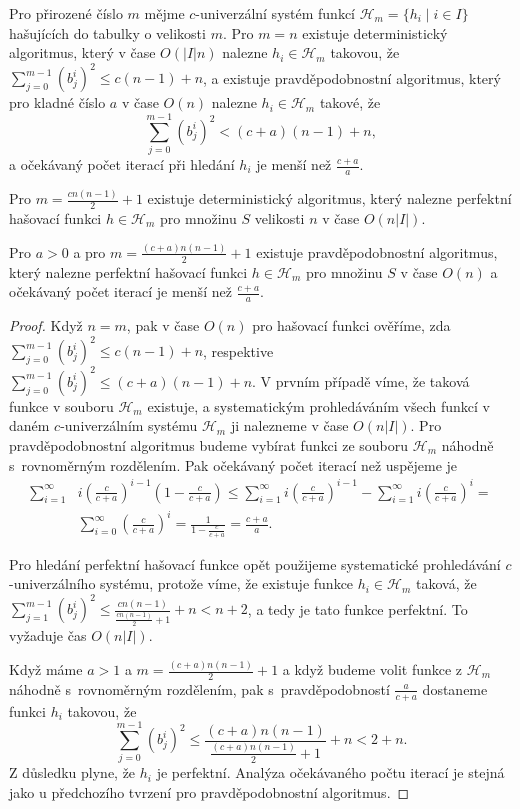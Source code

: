\documentclass[a4paper,12pt]{article}
\begin{document}
\begin{tvrzeni}Pro přirozené číslo $m$ mějme $
c$-univerzální systém funkcí $\mathcal H_m=\{h_i\mid i\in 
I\}$ hašujících do tabulky o velikosti 
$m$. Pro $m=n$ existuje deterministický algoritmus, 
který v čase $O(|I|n)$ nalezne $h_i\in \mathcal H_m$ takovou, že $
\sum_{j=0}^{m-1}(b^i_j)^2\le c(n-1)+n$, 
a existuje pravděpodobnostní algoritmus, který pro kladné číslo 
$a$ v čase $O(n)$ nalezne $h_i\in \mathcal H_m$ takové, že 
$$\sum_{j=0}^{m-1}(b^i_j)^2<(c+a)(n-1)+n,$$
a očekávaný počet iterací při hledání $h_i$ je menší než $\frac {
c+a}a$.   

Pro $m=\frac {cn(n-1)}2+1$ existuje deterministický algoritmus, 
který nalezne perfektní hašovací funkci  $h\in \mathcal H_
m$ pro množinu $S$ 
velikosti $n$ v čase $O(n|I|)$.

Pro $a>0$ a pro $m=\frac {(c+a)n(n-1)}2+1$ existuje 
pravděpodobnostní algoritmus, který nalezne perfektní hašovací 
funkci $h\in \mathcal H_m$ pro množinu $S$ v čase $O(n)$ a očekávaný počet 
iterací je menší než $\frac {c+a}a$.  
\end{tvrzeni}

\begin{proof}Když $n=m$, pak v čase $O(n)$ pro  
hašovací funkci ověříme, zda $\sum_{j=0}^{m-1}(b^
i_j)^2\le c(n-1)+n$, respektive 
$\sum_{j=0}^{m-1}(b^i_j)^2\le (c+a)(n-1)+n$.  V prvním případě víme, že taková 
funkce v souboru $\mathcal H_m$ existuje, a systematickým prohledáváním 
všech funkcí v daném $c$-univerzálním systému $\mathcal H_
m$ ji nalezneme 
v čase $O(n|I|)$.  Pro pravděpodobnostní algoritmus budeme 
vybírat funkci ze souboru $\mathcal H_m$ náhodně s~rovnoměrným 
rozdělením.  Pak očekávaný počet iterací než uspějeme je 
\begin{align*}\sum_{i=1}^{\infty}&i(\frac c{c+a})^{i-1}(1-\frac c{c+a})
\le\sum_{i=1}^{\infty}i(\frac c{c+a})^{i-1}-\sum_{i=1}^{\infty}i(\frac 
c{c+a})^i=\\
&\sum_{i=0}^{\infty}(\frac c{c+a})^i=\frac 1{1-\frac c{c+a}}=\frac {c
+a}a.\end{align*}

Pro hledání perfektní hašovací funkce opět použijeme 
syste\-ma\-tické prohledávání $c$-univer\-zál\-ního systému, protože 
víme, že existuje funkce $h_i\in \mathcal H_m$ taková, že 
$\sum_{j=1}^{m-1}(b^i_j)^2\le\frac {cn(n-1)}{\frac {cn(n-1)}2+1}+
n<n+2$, a tedy je tato funkce perfektní. 
To vyžaduje čas $O(n|I|)$. 

Když máme $a>1$ a $m=\frac {(c+a)n(n-1)}2+1$ 
a když budeme volit funkce z $\mathcal H_m$ 
náhodně s~rovnoměrným rozdělením, pak s~pravděpodobností 
$\frac a{c+a}$ do\-sta\-ne\-me funkci $h_i$ takovou, že 
$$\sum_{j=0}^{m-1}(b^i_j)^2\le\frac {(c+a)n(n-1)}{\frac {(c+a)n(n
-1)}2+1}+n<2+n.$$
Z důsledku plyne, že $h_i$ je perfektní.  Analýza 
očekávaného počtu iterací je stejná jako u předchozího tvrzení 
pro pravděpodobnostní algoritmus. 
\end{proof}
\end{document}
